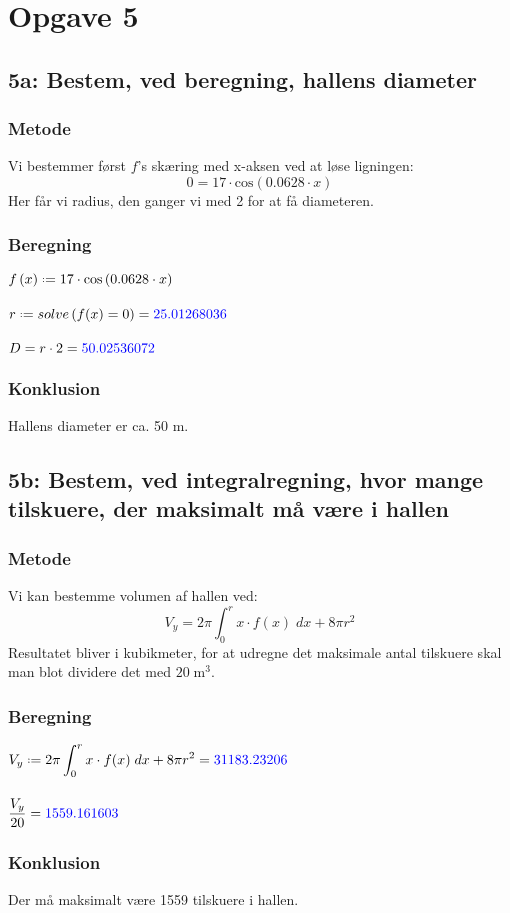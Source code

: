 \documentclass[../main.tex]{subfiles}
\begin{document}
\section*{Opgave 5}
\subsection*{5a: Bestem, ved beregning, hallens diameter}
    \subsubsection*{Metode}
        Vi bestemmer først \(f\)'s skæring med x-aksen ved at løse ligningen:
        \[0=17\cdot \text{cos}(0.0628\cdot x)\]
        Her får vi radius, den ganger vi med 2 for at få diameteren.
    \subsubsection*{Beregning}
    \(f\left(x\right)\defeq 17\cdot \cos\left( 0.0628\cdot x\right)\)\\\\
        \(r \defeq solve\left(f(x)=0\right) = \textcolor{blue}{25.01268036}\)\\\\
        \(D = r \cdot 2 = \textcolor{blue}{50.02536072}\)
    \subsubsection*{Konklusion}
        Hallens diameter er ca. 50 m.
\vspace*{1.7 cm}
\subsection*{5b: Bestem, ved integralregning, hvor mange tilskuere, der maksimalt må være i hallen}
    \subsubsection*{Metode}
        Vi kan bestemme volumen af hallen ved:
        \[ V_y = 2 \pi \int _0 ^r x\cdot f(x) \; dx + 8\pi r^2\]
        Resultatet bliver i kubikmeter, for at udregne det maksimale antal tilskuere skal man blot dividere det med \(20\; \text{m}^3\).
    \subsubsection*{Beregning}
    \(\displaystyle V_y \defeq 2 \pi \int _0 ^r x\cdot f(x) \; dx + 8\pi r^2 = \textcolor{blue}{31183.23206}\)\\\\
    \(\displaystyle \frac{V_y}{20}=\textcolor{blue}{1559.161603}\)
    \subsubsection*{Konklusion}
    Der må maksimalt være 1559 tilskuere i hallen.
\end{document}
